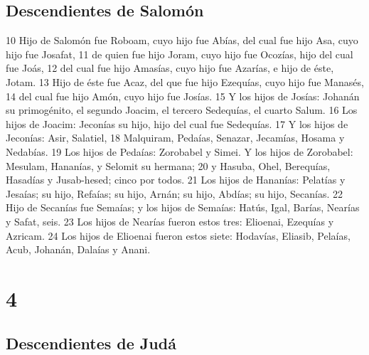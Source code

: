 \section*{Descendientes de Salomón}

10 Hijo de Salomón fue Roboam, cuyo hijo fue Abías, del cual fue hijo Asa, cuyo hijo fue Josafat,
11 de quien fue hijo Joram, cuyo hijo fue Ocozías, hijo del cual fue Joás,
12 del cual fue hijo Amasías, cuyo hijo fue Azarías, e hijo de éste, Jotam.
13 Hijo de éste fue Acaz, del que fue hijo Ezequías, cuyo hijo fue Manasés,
14 del cual fue hijo Amón, cuyo hijo fue Josías.
15 Y los hijos de Josías: Johanán su primogénito, el segundo Joacim, el tercero Sedequías, el cuarto Salum.
16 Los hijos de Joacim: Jeconías su hijo, hijo del cual fue Sedequías.
17 Y los hijos de Jeconías: Asir, Salatiel,
18 Malquiram, Pedaías, Senazar, Jecamías, Hosama y Nedabías.
19 Los hijos de Pedaías: Zorobabel y Simei. Y los hijos de Zorobabel: Mesulam, Hananías, y Selomit su hermana;
20 y Hasuba, Ohel, Berequías, Hasadías y Jusab-hesed; cinco por todos.
21 Los hijos de Hananías: Pelatías y Jesaías; su hijo, Refaías; su hijo, Arnán; su hijo, Abdías; su hijo, Secanías.
22 Hijo de Secanías fue Semaías; y los hijos de Semaías: Hatús, Igal, Barías, Nearías y Safat, seis.
23 Los hijos de Nearías fueron estos tres: Elioenai, Ezequías y Azricam.
24 Los hijos de Elioenai fueron estos siete: Hodavías, Eliasib, Pelaías, Acub, Johanán, Dalaías y Anani.

\chapter{4}

\section*{Descendientes de Judá}


